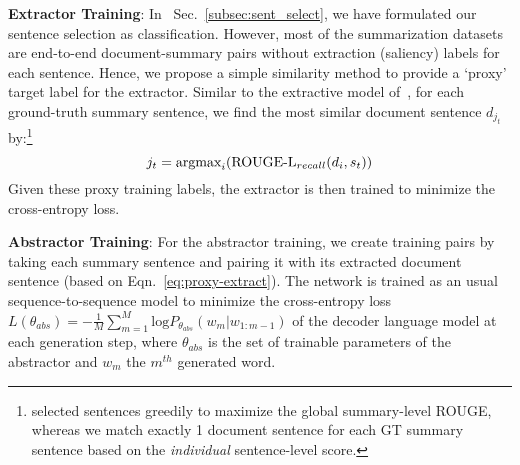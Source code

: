 \documentclass[11pt,a4paper]{article}
\def\secref#1{Sec.~\ref{#1}}
\def\eqnref#1{Eqn.~\ref{#1}}
\begin{document}
\noindent\textbf{Extractor Training}: In ~\secref{subsec:sent_select}, we have formulated our sentence selection as classification. 
However, most of the summarization datasets are end-to-end document-summary pairs without extraction (saliency) labels for each sentence.
Hence, we propose a simple similarity method to provide a `proxy' target label for the extractor. Similar to the extractive model of~, for each ground-truth summary sentence, we find the most similar document sentence $d_{j_t}$ by:\footnote{ 
selected sentences greedily to maximize the global summary-level ROUGE, whereas we match exactly 1 document sentence for each GT summary sentence based on the \textit{individual} sentence-level score.}
\vspace{-5pt}
\begin{equation} 
\label{eq:proxy-extract}
j_t = \text{argmax}_i(\text{ROUGE-L}_{recall}(d_i, s_t))
\vspace{-5pt}
\end{equation}
Given these proxy training labels, the extractor is then trained to minimize the cross-entropy loss.

\noindent\textbf{Abstractor Training}: For the abstractor training, we create training pairs by taking each summary sentence and pairing it with its extracted document sentence (based on \eqnref{eq:proxy-extract}). The network is trained as an usual sequence-to-sequence model to minimize 
the cross-entropy loss
$
L(\theta_{abs}) = - \frac{1}{M}\sum_{m=1}^{M}\text{log}P_{\theta_{abs}}(w_m|w_{1:m-1})
$
of the decoder language model at each generation step,
where $\theta_{abs}$ is the set of trainable parameters of the abstractor and $w_m$ the $m^{th}$ generated word.
\end{document}
